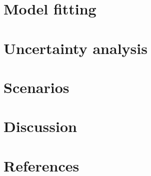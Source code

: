 \documentclass[11pt,a4paper]{article}
\begin{document}
\section{Model fitting}

\section{Uncertainty analysis}

\section{Scenarios}

\section{Discussion}

\section{References}
\end{document}
